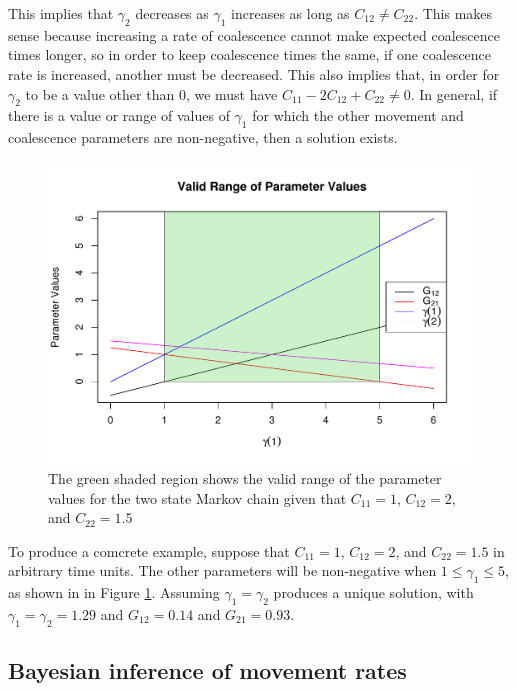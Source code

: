\documentclass{article}
\begin{document}
This implies that $\gamma_2$ decreases as $\gamma_1$ increases as long as $C_{12} \neq C_{22}$.
This makes sense because
increasing a rate of coalescence cannot make expected coalescence times longer,
so in order to keep coalescence times the same,
if one coalescence rate is increased, another must be decreased.
This also implies that, in order for $\gamma_2$ to be a value other than $0$, 
we must have $C_{11} - 2C_{12} + C_{22} \neq 0$.
In general, if there is a value or range of values of $\gamma_1$
for which the other movement and coalescence parameters are non-negative,
then a solution exists.

\begin{figure}
\centering
         \includegraphics[scale=.7]{figs/valid_range}
    \caption{The green shaded region shows 
        the valid range of the parameter values
        for the two state Markov chain given that
        $C_{11}=1$, $C_{12}=2$, and $C_{22}=1.5$}
    \label{fig:valid_range}
\end{figure}

To produce a comcrete example, suppose that
$C_{11} = 1$, $C_{12} = 2$, and $C_{22} = 1.5$ in arbitrary time units.
The other parameters will be non-negative 
when $1 \leq \gamma_1 \leq 5$,
as shown in in Figure \ref{fig:valid_range}.
Assuming $\gamma_1 = \gamma_2$ produces a unique solution, 
with $\gamma_1 = \gamma_2 = 1.29$ and $G_{12} = 0.14$ and $G_{21} = 0.93$.


\subsection*{Bayesian inference of movement rates}
\end{document}
